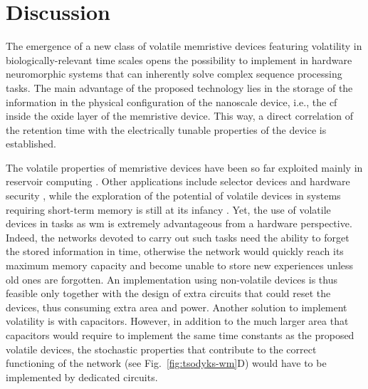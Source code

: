 \section{Discussion}
\label{sec:disc}

The emergence of a new class of volatile memristive devices featuring volatility in biologically-relevant time scales opens the possibility to implement in hardware neuromorphic systems that can inherently solve complex sequence processing tasks. The main advantage of the proposed technology lies in the storage of the information in the physical configuration of the nanoscale device, i.e., the \gls{cf} inside the oxide layer of the memristive device. This way, a direct correlation of the retention time with the electrically tunable properties of the device is established.

The volatile properties of memristive devices have been so far exploited mainly in reservoir computing \cite{du2017NatComm,midya2019AdvIntellSys,zhong2021NatComm}. Other applications include selector devices and hardware security \cite{wang2020AdvIntellSys}, while the exploration of the potential of volatile devices in systems requiring short-term memory is still at its infancy \cite{ji2022AdvIntellSys,giotis2022palimpsest}. Yet, the use of volatile devices in tasks as \gls{wm} is extremely advantageous from a hardware perspective. Indeed, the networks devoted to carry out such tasks need the ability to forget the stored information in time, otherwise the network would quickly reach its maximum memory capacity and become unable to store new experiences unless old ones are forgotten. An implementation using non-volatile devices is thus feasible only together with the design of extra circuits that could reset the devices, thus consuming extra area and power. Another solution to implement volatility is with capacitors. However, in addition to the much larger area that capacitors would require to implement the same time constants as the proposed volatile devices, the stochastic properties that contribute to the correct functioning of the network (see Fig.~\ref{fig:tsodyks-wm}D) would have to be implemented by dedicated circuits.

